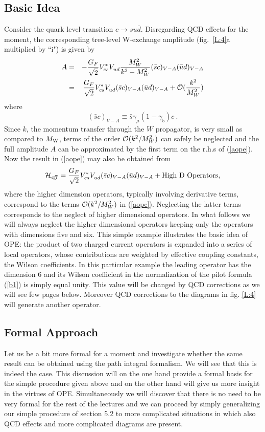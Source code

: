 \documentclass[12pt]{article}
\newcommand{\mw}{M_{\rm W}}
\newcommand{\be}{\begin{equation}}
\newcommand{\ee}{\end{equation}}
\newcommand{\ord}{{\cal O}}
\def\gf{\gamma_5}
\begin{document}
\begin{itemize}
\begin{itemize}
\subsection{Basic Idea}
Consider 
the quark level transition  $c\to su\bar d$.
Disregarding QCD effects for the moment,  the corresponding
tree-level W-exchange
amplitude (fig.~\ref{L:4}a multiplied by ``i") is given by
\begin{eqnarray}\label{aope}
A&=&-{G_F\over\sqrt{2}}V^*_{cs}V_{ud}^{}{M^2_W\over k^2-M^2_W}
  (\bar sc)_{V-A}(\bar ud)_{V-A} \nonumber\\
 &=& {G_F\over\sqrt{2}}V^*_{cs}V_{ud}^{}
  (\bar sc)_{V-A}(\bar ud)_{V-A} + \ord({k^2\over M^2_W})
\end{eqnarray}
where 
\be
(\bar sc)_{V-A}\equiv
\bar s\gamma_{\mu} (1-\gf)c~.
\ee
Since $k$, the momentum transfer through the $W$ propagator, is very
small as compared to $\mw$, terms of the order $\ord({k^2/M^2_W})$
can safely be neglected and the full amplitude $A$ can be approximated
by the first term on the r.h.s of (\ref{aope}).
Now the result in (\ref{aope}) may  also be obtained from 
\begin{equation}\label{hc0}
{\cal H}_{\it eff}={G_F\over\sqrt{2}}V^*_{cs}V_{ud}^{}
  (\bar sc)_{V-A}(\bar ud)_{V-A} + {\rm High~ D~ Operators},
  \end{equation}
 where the higher dimension operators, typically involving derivative
terms, correspond to the terms $\ord({k^2/M^2_W})$ in (\ref{aope}).
Neglecting the latter terms corresponds to the neglect of higher
dimensional operators. In what follows we will always neglect 
the higher dimensional operators keeping only the operators with
dimensions five
and six.
This
 simple example illustrates the basic idea of  OPE:
the product of two charged current
operators is expanded into a series of local operators,
whose contributions are weighted by effective coupling constants,
the Wilson coefficients. In this particular example the leading
operator has the dimension 6 and its Wilson coefficient in the
normalization of the pilot formula (\ref{b1}) is simply equal
unity. This value will be changed by QCD corrections as we will
see few pages below. Moreover QCD corrections to the diagrams in
fig. \ref{L:4} will generate another operator.

\subsection{Formal Approach}
Let us be a bit more formal for a moment and investigate whether
the same result can be obtained using the path integral formalism.
We will see that this is indeed the case. This discussion will
on the one hand provide a formal basis for the simple procedure
given above and on the other hand will give us more insight
in the virtues of OPE. Simultaneously we will discover that
there is no need to be very formal for the rest of the lectures
and we can proceed by simply generalizing our simple procedure
of section 5.2 to more complicated situations in which also QCD 
effects and more complicated diagrams are
present. 


\end{itemize}
\end{itemize}
\end{document}
